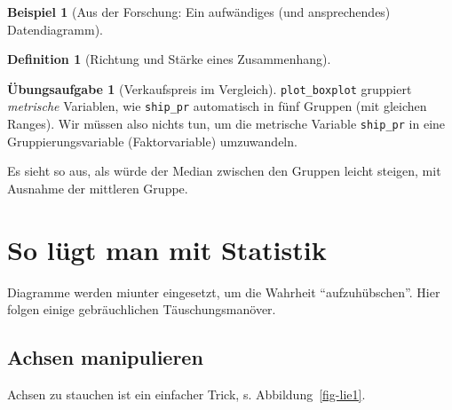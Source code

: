 \documentclass[
  a4paper,
]{scrbook}
\theoremstyle{definition}
\newtheorem{example}{Beispiel}[chapter]
\theoremstyle{definition}
\newtheorem{definition}{Definition}[chapter]
\theoremstyle{definition}
\newtheorem{exercise}{Übungsaufgabe}[chapter]
\theoremstyle{remark}
\begin{document}
\begin{example}[Aus der Forschung: Ein aufwändiges (und ansprechendes)
Datendiagramm]
\begin{definition}[Richtung und Stärke eines
Zusammenhang]
\begin{exercise}[Verkaufspreis im
Vergleich]
\texttt{plot\_boxplot} gruppiert \emph{metrische} Variablen, wie
\texttt{ship\_pr} automatisch in fünf Gruppen (mit gleichen Ranges). Wir
müssen also nichts tun, um die metrische Variable \texttt{ship\_pr} in
eine Gruppierungsvariable (Faktorvariable) umzuwandeln.

Es sieht so aus, als würde der Median zwischen den Gruppen leicht
steigen, mit Ausnahme der mittleren Gruppe.

\end{exercise}

\section{So lügt man mit Statistik}\label{so-luxfcgt-man-mit-statistik}

Diagramme werden miunter eingesetzt, um die Wahrheit ``aufzuhübschen''.
Hier folgen einige gebräuchlichen Täuschungsmanöver.

\subsection{Achsen manipulieren}\label{achsen-manipulieren}

Achsen zu stauchen ist ein einfacher Trick, s. Abbildung~\ref{fig-lie1}.

\begin{figure}

\begin{minipage}{0.50\linewidth}

\end{minipage}
\end{figure}
\end{definition}
\end{example}
\end{document}
